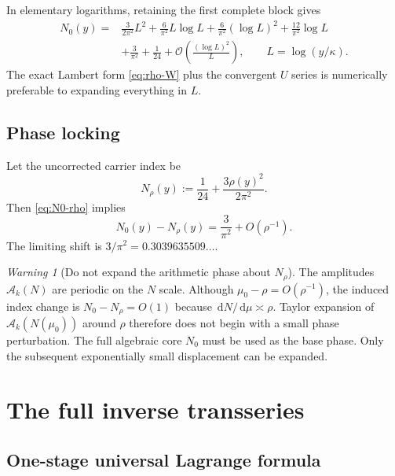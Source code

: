 \documentclass[11pt,a4paper]{article}
\numberwithin{equation}{section}
\theoremstyle{definition}
\theoremstyle{remark}
\newtheorem{warning}[theorem]{Warning}
\newcommand{\dd}{\,\mathrm d}
\newcommand{\bigO}{\mathcal O}
\newcommand{\Acal}{\mathcal A}
\begin{document}
In elementary logarithms, retaining the first complete block gives
\begin{equation}\label{eq:N0-L}
\begin{split}
 N_0(y)={}&\frac{3}{2\pi^2}L^2
 +\frac{6}{\pi^2}L\log L
 +\frac{6}{\pi^2}(\log L)^2
 +\frac{12}{\pi^2}\log L\\
 &+\frac3{\pi^2}+\frac1{24}
 +\bigO\!\left(\frac{(\log L)^2}{L}\right),
 \qquad L=\log(y/\kappa).
\end{split}
\end{equation}
The exact Lambert form \eqref{eq:rho-W} plus the convergent $U$ series is
numerically preferable to expanding everything in $L$.

\subsection{Phase locking}

Let the uncorrected carrier index be
\begin{equation}\label{eq:Nrho}
 N_\rho(y):=\frac1{24}+\frac{3\rho(y)^2}{2\pi^2}.
\end{equation}
Then \eqref{eq:N0-rho} implies
\begin{equation}\label{eq:phase-shift}
 \boxed{
 N_0(y)-N_\rho(y)=\frac3{\pi^2}+O(\rho^{-1}).}
\end{equation}
The limiting shift is $3/\pi^2=0.3039635509\ldots$.

\begin{warning}[Do not expand the arithmetic phase about $N_\rho$]
The amplitudes $\Acal_k(N)$ are periodic on the $N$ scale.  Although
$\mu_0-\rho=O(\rho^{-1})$, the induced index change is
$N_0-N_\rho=O(1)$ because $\dd N/\dd\mu\asymp\rho$.  Taylor expansion of
$\Acal_k(N(\mu_0))$ around $\rho$ therefore does not begin with a small phase
perturbation.  The full algebraic core $N_0$ must be used as the base phase.
Only the subsequent exponentially small displacement can be expanded.
\end{warning}

\section{The full inverse transseries}

\subsection{One-stage universal Lagrange formula}
\end{document}
